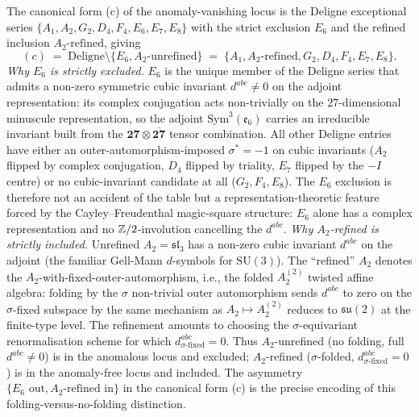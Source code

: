\begin{remark}\ClaimStatusHealed
\label{wn:rmk:healed-canonical-form-c}
The canonical form (c) of the anomaly-vanishing locus is the
Deligne exceptional series $\{A_1, A_2, G_2, D_4, F_4, E_6, E_7, E_8\}$
with the strict exclusion $E_6$ and the refined inclusion
$A_2\text{-refined}$, giving
\[
(c) \;=\; \mathrm{Deligne}\setminus\{E_6, A_2\text{-unrefined}\}
\;=\; \{A_1, A_2\text{-refined}, G_2, D_4, F_4, E_7, E_8\}.
\]
\emph{Why $E_6$ is strictly excluded.} $E_6$ is the unique member of
the Deligne series that admits a non-zero symmetric cubic invariant
$d^{abc} \neq 0$ on the adjoint representation: its complex conjugation
acts non-trivially on the $27$-dimensional minuscule representation,
so the adjoint $\mathrm{Sym}^3(\mathfrak{e}_6)$ carries an irreducible
invariant built from the $\mathbf{27} \otimes \overline{\mathbf{27}}$
tensor combination. All other Deligne entries have either an
outer-automorphism-imposed $\sigma^* = -1$ on cubic invariants
($A_2$ flipped by complex conjugation, $D_4$ flipped by triality, $E_7$
flipped by the $-I$ centre) or no cubic-invariant candidate at all
($G_2, F_4, E_8$). The $E_6$ exclusion is therefore not an accident
of the table but a representation-theoretic feature forced by the
Cayley--Freudenthal magic-square structure: $E_6$ alone has a
complex representation and no $\mathbb{Z}/2$-involution cancelling the
$d^{abc}$.
\emph{Why $A_2$-refined is strictly included.} Unrefined $A_2
= \mathfrak{sl}_3$ has a non-zero cubic invariant $d^{abc}$ on the
adjoint (the familiar Gell-Mann $d$-symbols for $\mathrm{SU}(3)$).
The ``refined'' $A_2$ denotes the $A_2$-with-fixed-outer-automorphism,
i.e., the folded $A_2^{(2)}$ twisted affine algebra: folding by the
$\sigma$ non-trivial outer automorphism sends $d^{abc}$ to zero on
the $\sigma$-fixed subspace by the same mechanism as $A_2\mapsto
A_2^{(2)}$ reduces to $\mathfrak{su}(2)$ at the finite-type level.
The refinement amounts to choosing the $\sigma$-equivariant
renormalisation scheme for which $d^{abc}_{\sigma\text{-fixed}} = 0$.
Thus $A_2$-unrefined (no folding, full $d^{abc} \neq 0$) is in the
anomalous locus and excluded; $A_2$-refined ($\sigma$-folded,
$d^{abc}_{\sigma\text{-fixed}} = 0$) is in the anomaly-free locus
and included. The asymmetry $\{E_6 \text{ out}, A_2\text{-refined
in}\}$ in the canonical form (c) is the precise encoding of this
folding-versus-no-folding distinction.
\end{remark}

